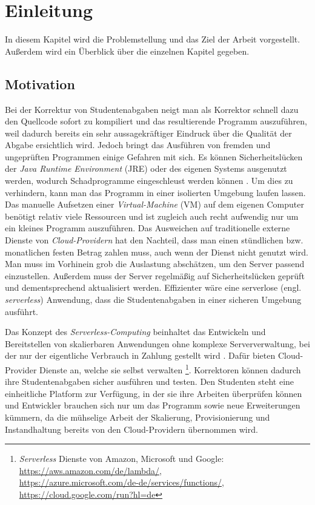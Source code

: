 \chapter{Einleitung}
In diesem Kapitel wird die Problemstellung und das Ziel der Arbeit vorgestellt.
Außerdem wird ein Überblick über die einzelnen Kapitel gegeben.

\section{Motivation}
Bei der Korrektur von Studentenabgaben neigt man als Korrektor schnell dazu den Quellcode sofort 
zu kompiliert und das resultierende Programm auszuführen, 
weil dadurch bereits ein sehr aussagekräftiger Eindruck über die Qualität der Abgabe ersichtlich wird. 
Jedoch bringt das Ausführen von fremden und ungeprüften Programmen einige Gefahren mit sich.
Es können Sicherheitslücken der \textit{Java Runtime Environment} (JRE) \cite{Jre}
oder des eigenen Systems ausgenutzt werden, wodurch Schadprogramme eingeschleust
werden können \cite{CveJreVuln}.
Um dies zu verhindern, kann man das Programm in einer isolierten Umgebung laufen lassen.
Das manuelle Aufsetzen einer \textit{Virtual-Machine} (VM) \cite{RedHatVM} auf dem eigenen Computer
benötigt relativ viele Ressourcen und ist zugleich auch recht aufwendig nur um ein kleines Programm auszuführen.
Das Ausweichen auf traditionelle externe Dienste von \textit{Cloud-Providern} hat den Nachteil,
dass man einen stündlichen bzw. monatlichen festen Betrag zahlen muss,
auch wenn der Dienst nicht genutzt wird. Man muss im Vorhinein grob die Auslastung abschätzen,
um den Server passend einzustellen. Außerdem muss der Server regelmäßig auf
Sicherheitslücken geprüft und dementsprechend aktualisiert werden.
Effizienter wäre eine serverlose (engl. \textit{serverless}) Anwendung, dass die
Studentenabgaben in einer sicheren Umgebung ausführt.

Das Konzept des \textit{Serverless-Computing} beinhaltet das Entwickeln und Bereitstellen
von skalierbaren Anwendungen ohne komplexe Serververwaltung, bei der nur der eigentliche Verbrauch
in Zahlung gestellt wird \cite{CioGov}.
Dafür bieten Cloud-Provider Dienste an, welche sie selbst verwalten
\footnote{
  \textit{Serverless} Dienste von Amazon, Microsoft und Google: \\
  {\url{https://aws.amazon.com/de/lambda/}}, \\
  {\url{https://azure.microsoft.com/de-de/services/functions/}}, \\
  {\url{https://cloud.google.com/run?hl=de}}
}.
Korrektoren können dadurch ihre Studentenabgaben sicher ausführen und testen.
Den Studenten steht eine einheitliche Platform zur Verfügung, in der sie ihre Arbeiten überprüfen können und
Entwickler brauchen sich nur um das Programm sowie neue Erweiterungen kümmern, da die mühselige Arbeit
der Skalierung, Provisionierung und Instandhaltung bereits von den Cloud-Providern übernommen wird.

